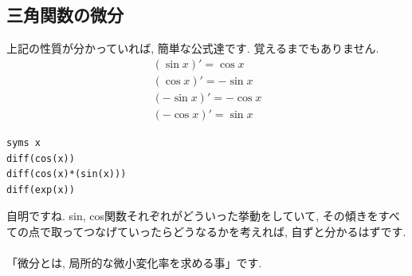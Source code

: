 \documentclass[11pt,a4paper]{jreport}
\begin{document}
\subsection{三角関数の微分}
上記の性質が分かっていれば, 簡単な公式達です. 覚えるまでもありません.
\begin{eqnarray}
(\sin x)' = \cos x \\
(\cos x)' = -\sin x \\
(-\sin x)' = -\cos x \\
(-\cos x)' = \sin x
\end{eqnarray}

\begin{lstlisting}[caption=いろんな微分,label=sc:diff]
syms x
diff(cos(x))
diff(cos(x)*(sin(x)))
diff(exp(x))
\end{lstlisting}
自明ですね. sin, cos関数それぞれがどういった挙動をしていて, その傾きをすべての点で取ってつなげていったらどうなるかを考えれば, 自ずと分かるはずです.\\
\\
「微分とは, 局所的な微小変化率を求める事」です.\\
\end{document}
